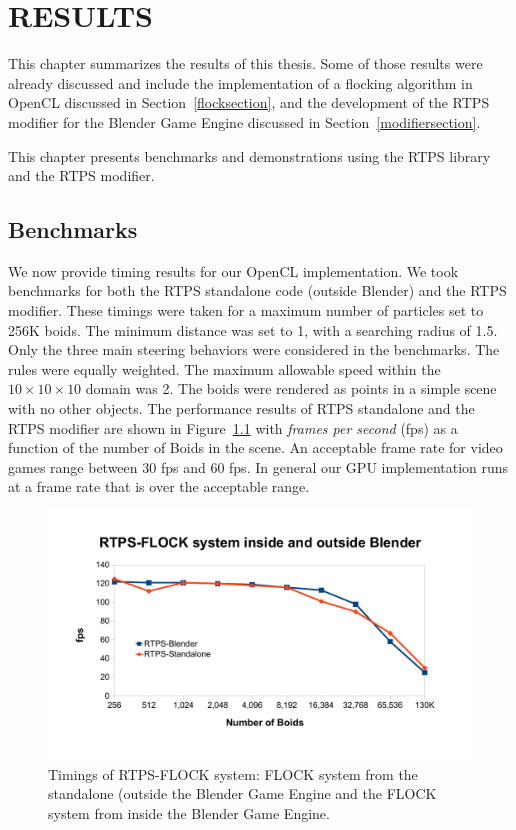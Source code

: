 \chapter{RESULTS}\label{resultsChapter}

This chapter summarizes the results of this thesis. Some of those results were already discussed and include the implementation of a flocking algorithm in OpenCL discussed in Section~\ref{flocksection}, and the development of the RTPS modifier for the Blender Game Engine discussed in Section~\ref{modifiersection}. 

This chapter presents benchmarks and demonstrations using the RTPS library and the RTPS modifier.

\section{Benchmarks}

We now provide timing results for our OpenCL implementation. We took benchmarks for both the RTPS standalone code (outside Blender) and the RTPS modifier. These timings were taken for a maximum number of particles set to 256K boids. The minimum distance was set to 1, with a searching radius of 1.5. Only the three main steering behaviors were considered in the benchmarks. The rules were equally weighted. The maximum allowable speed within the $10\times 10\times 10$ domain was 2. The boids were rendered as points in a simple scene with no other objects. The performance results of RTPS standalone and the RTPS modifier are shown in Figure~\ref{RTPSvsRTPS} with \textit{frames per second} (fps) as a function of the number of Boids in the scene. An acceptable frame rate for video games range between 30 fps and 60 fps. In general our GPU implementation runs at a frame rate that is over the acceptable range. 

\begin{figure}[htbp]
\begin{center}
\includegraphics[scale=0.7]{figures/RTPSvsRTPS.pdf}
\caption{Timings of RTPS-FLOCK system: FLOCK system from the standalone (outside the Blender Game Engine and the FLOCK system from inside the Blender Game Engine.}
\label{RTPSvsRTPS}
\end{center}
\end{figure}

